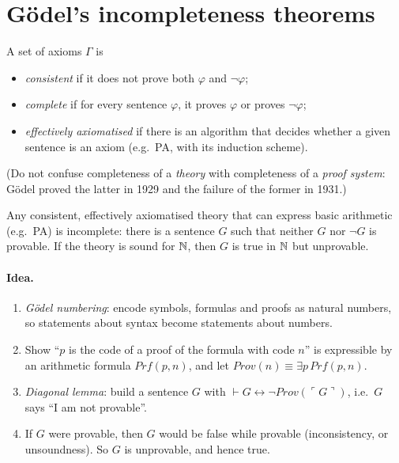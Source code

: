 \section{G\"odel's incompleteness theorems}

\begin{definition}
A set of axioms $\Gamma$ is
\begin{itemize}
  \item \emph{consistent} if it does not prove both $\varphi$ and $\neg\varphi$;
  \item \emph{complete} if for every sentence $\varphi$, it proves $\varphi$ or proves
        $\neg\varphi$;
  \item \emph{effectively axiomatised} if there is an algorithm that decides whether a
        given sentence is an axiom (e.g.\ PA, with its induction scheme).
\end{itemize}
(Do not confuse completeness of a \emph{theory} with completeness of a \emph{proof
system}: G\"odel proved the latter in 1929 and the failure of the former in 1931.)
\end{definition}

\begin{theorem}
Any consistent, effectively axiomatised theory that can express basic arithmetic (e.g.\
PA) is incomplete: there is a sentence $G$ such that neither $G$ nor $\neg G$ is
provable. If the theory is sound for $\mathbb{N}$, then $G$ is true in $\mathbb{N}$ but unprovable.
\end{theorem}

\paragraph{Idea.}
\begin{enumerate}
  \item \emph{G\"odel numbering}: encode symbols, formulas and proofs as natural numbers,
        so statements about syntax become statements about numbers.
  \item Show ``$p$ is the code of a proof of the formula with code $n$'' is expressible
        by an arithmetic formula $\mathit{Prf}(p,n)$, and let
        $\mathit{Prov}(n)\equiv\exists p\,\mathit{Prf}(p,n)$.
  \item \emph{Diagonal lemma}: build a sentence $G$ with
        $\vdash G\leftrightarrow\neg\mathit{Prov}(\ulcorner G\urcorner)$, i.e.\ $G$ says
        ``I am not provable''.
  \item If $G$ were provable, then $G$ would be false while provable (inconsistency, or
        unsoundness). So $G$ is unprovable, and hence true.
\end{enumerate}

